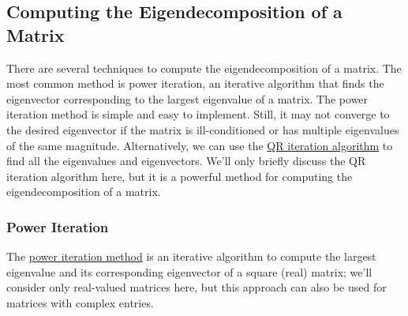 \documentclass{article}[11pt]
\begin{document}
\subsection{Computing the Eigendecomposition of a Matrix}
There are several techniques to compute the eigendecomposition of a matrix. 
The most common method is power iteration, an iterative algorithm that finds the eigenvector corresponding to the largest eigenvalue of a matrix. The power iteration method is simple and easy to implement. Still, it may not converge to the desired eigenvector if the matrix is ill-conditioned or has multiple eigenvalues of the same magnitude.
Alternatively, we can use the \href{https://en.wikipedia.org/wiki/QR_algorithm}{QR iteration algorithm} to find all the eigenvalues and eigenvectors. We'll only briefly discuss the QR iteration algorithm here, but it is a powerful method for computing the eigendecomposition of a matrix.

\subsubsection*{Power Iteration}
The \href{https://en.wikipedia.org/wiki/Power_iteration}{power iteration method} 
is an iterative algorithm to compute the largest eigenvalue and its corresponding eigenvector of a square (real) matrix; we'll consider only real-valued matrices here, 
but this approach can also be used for matrices with complex entries. 
\end{document}
